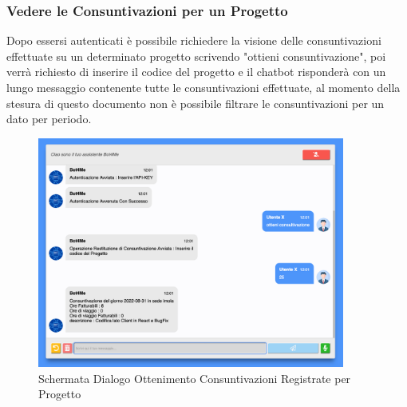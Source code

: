 \subsubsection{Vedere le Consuntivazioni per un Progetto}
Dopo essersi autenticati è possibile richiedere la visione delle consuntivazioni effettuate su un determinato progetto scrivendo "ottieni consuntivazione", poi verrà richiesto di inserire il codice del progetto e il chatbot risponderà con un lungo messaggio contenente tutte le consuntivazioni effettuate, al momento della stesura di questo documento non è possibile filtrare le consuntivazioni per un dato per periodo. 
\begin{figure}[H]
    \centering\includegraphics[width=0.9\textwidth, height=0.7\textheight, keepaspectratio]{images/schermata_ottieni_consultivazione.png}
    \caption{Schermata Dialogo Ottenimento Consuntivazioni Registrate per Progetto}
\end{figure}